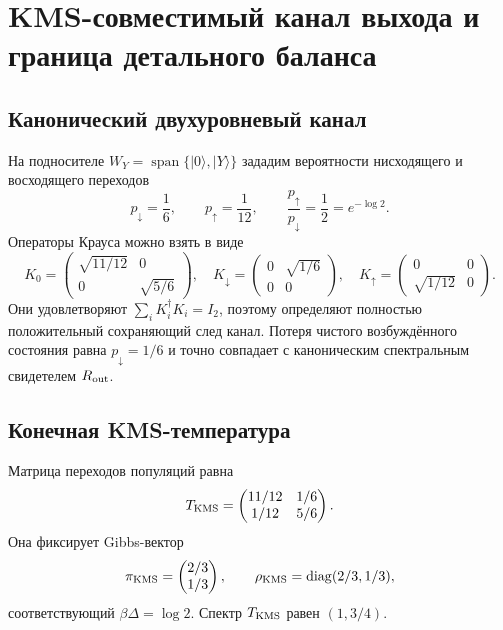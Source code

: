 \chapter{KMS-совместимый канал выхода и граница детального баланса}
\label{ch:v10-breathing-k43-kms-output-channel}

\section{Канонический двухуровневый канал}

На подносителе $W_Y=\operatorname{span}\{|0\rangle,|Y\rangle\}$ зададим
вероятности нисходящего и восходящего переходов
\begin{equation}
 p_\downarrow=\frac16,\qquad p_\uparrow=\frac1{12},
 \qquad \frac{p_\uparrow}{p_\downarrow}
 =\frac12=e^{-\log2}.
 \label{eq:v10-k43-kms-rates}
\end{equation}
Операторы Крауса можно взять в виде
\begin{equation}
 K_0=\begin{pmatrix}\sqrt{11/12}&0\\0&\sqrt{5/6}\end{pmatrix},
 \quad
 K_\downarrow=\begin{pmatrix}0&\sqrt{1/6}\\0&0\end{pmatrix},
 \quad
 K_\uparrow=\begin{pmatrix}0&0\\\sqrt{1/12}&0\end{pmatrix}.
 \label{eq:v10-k43-kms-kraus}
\end{equation}
Они удовлетворяют $\sum_iK_i^\dagger K_i=I_2$, поэтому определяют полностью
положительный сохраняющий след канал. Потеря чистого возбуждённого состояния
равна $p_\downarrow=1/6$ и точно совпадает с каноническим спектральным
свидетелем $R_{\rm out}$.

\section{Конечная KMS-температура}

Матрица переходов популяций равна
\begin{equation}
 T_{\rm KMS}=
 \begin{pmatrix}
 11/12&1/6\\
 1/12&5/6
 \end{pmatrix}.
 \label{eq:v10-k43-kms-transition}
\end{equation}
Она фиксирует Gibbs-вектор
\begin{equation}
 \pi_{\rm KMS}=\begin{pmatrix}2/3\\1/3\end{pmatrix},
 \qquad
 \rho_{\rm KMS}=\operatorname{diag}(2/3,1/3),
 \label{eq:v10-k43-kms-state}
\end{equation}
соответствующий $\beta\Delta=\log2$. Спектр $T_{\rm KMS}$ равен
$(1,3/4)$.

